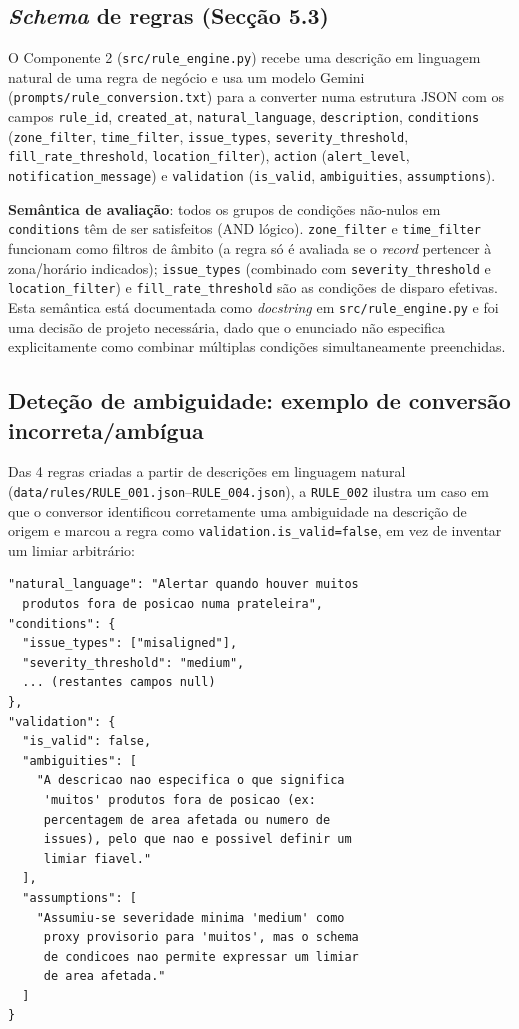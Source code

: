 \documentclass[conference]{IEEEtran}
\begin{document}
\subsection{\textit{Schema} de regras (Secção 5.3)}

O Componente 2 (\texttt{src/rule\_engine.py}) recebe uma descrição em
linguagem natural de uma regra de negócio e usa um modelo Gemini
(\texttt{prompts/rule\_conversion.txt}) para a converter numa estrutura JSON
com os campos \texttt{rule\_id}, \texttt{created\_at},
\texttt{natural\_language}, \texttt{description}, \texttt{conditions}
(\texttt{zone\_filter}, \texttt{time\_filter}, \texttt{issue\_types},
\texttt{severity\_threshold}, \texttt{fill\_rate\_threshold},
\texttt{location\_filter}), \texttt{action} (\texttt{alert\_level},
\texttt{notification\_message}) e \texttt{validation}
(\texttt{is\_valid}, \texttt{ambiguities}, \texttt{assumptions}).

\textbf{Semântica de avaliação}: todos os grupos de condições
não-nulos em \texttt{conditions} têm de ser satisfeitos (AND lógico).
\texttt{zone\_filter} e \texttt{time\_filter} funcionam como filtros de
âmbito (a regra só é avaliada se o \textit{record} pertencer à zona/horário
indicados); \texttt{issue\_types} (combinado com \texttt{severity\_threshold}
e \texttt{location\_filter}) e \texttt{fill\_rate\_threshold} são as
condições de disparo efetivas. Esta semântica está documentada como
\textit{docstring} em \texttt{src/rule\_engine.py} e foi uma decisão de
projeto necessária, dado que o enunciado não especifica explicitamente como
combinar múltiplas condições simultaneamente preenchidas.

\subsection{Deteção de ambiguidade: exemplo de conversão incorreta/ambígua}
\label{sec:rule-ambiguity}

Das 4 regras criadas a partir de descrições em linguagem natural
(\texttt{data/rules/RULE\_001.json}--\texttt{RULE\_004.json}), a
\texttt{RULE\_002} ilustra um caso em que o conversor identificou
corretamente uma ambiguidade na descrição de origem e marcou a regra como
\texttt{validation.is\_valid=false}, em vez de inventar um limiar arbitrário:

\begin{lstlisting}
"natural_language": "Alertar quando houver muitos
  produtos fora de posicao numa prateleira",
"conditions": {
  "issue_types": ["misaligned"],
  "severity_threshold": "medium",
  ... (restantes campos null)
},
"validation": {
  "is_valid": false,
  "ambiguities": [
    "A descricao nao especifica o que significa
     'muitos' produtos fora de posicao (ex:
     percentagem de area afetada ou numero de
     issues), pelo que nao e possivel definir um
     limiar fiavel."
  ],
  "assumptions": [
    "Assumiu-se severidade minima 'medium' como
     proxy provisorio para 'muitos', mas o schema
     de condicoes nao permite expressar um limiar
     de area afetada."
  ]
}
\end{lstlisting}
\end{document}
